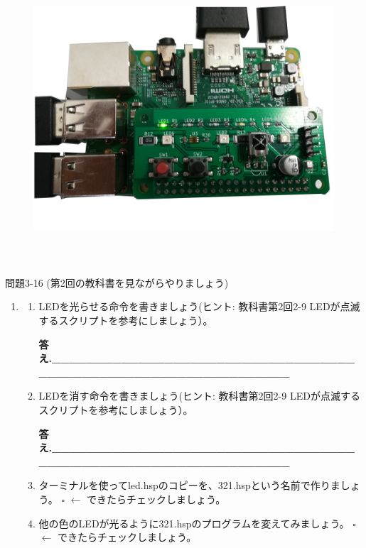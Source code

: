 \documentclass[a4paper,dvipdfmx]{jarticle}
\begin{document}
\begin{figure}
\centering
\includegraphics[width=14.369cm,height=10.776cm]{text03-img/text03-img032.jpg}
\end{figure}
{\ttfamily
問題3-16
(第2回の教科書を見ながらやりましょう)}

\begin{enumerate}
\item \begin{enumerate}
\item
LEDを光らせる命令を書きましょう(ヒント:
教科書第2回2-9
LEDが点滅するスクリプトを参考にしましょう）。


\bigskip


\bigskip

{\ttfamily\bfseries
答え.\_\_\_\_\_\_\_\_\_\_\_\_\_\_\_\_\_\_\_\_\_\_\_\_\_\_\_\_\_\_\_\_\_\_\_\_\_\_\_\_\_\_\_\_\_\_\_\_\_\_\_\_\_\_\_\_\_\_\_\_\_\_\_\_}


\bigskip
\item LEDを消す命令を書きましょう(ヒント:
教科書第2回2-9
LEDが点滅するスクリプトを参考にしましょう）。


\bigskip


\bigskip

{\ttfamily\bfseries
答え.\_\_\_\_\_\_\_\_\_\_\_\_\_\_\_\_\_\_\_\_\_\_\_\_\_\_\_\_\_\_\_\_\_\_\_\_\_\_\_\_\_\_\_\_\_\_\_\_\_\_\_\_\_\_\_\_\_\_\_\_\_\_\_\_}


\bigskip
\item
ターミナルを使ってled.hspのコピーを、321.hspという名前で作りましょう。\newline
${\square}$ $\leftarrow $
できたらチェックしましょう。
\item
他の色のLEDが光るように321.hspのプログラムを変えてみましょう。\newline
${\square}$ $\leftarrow $
できたらチェックしましょう。
\end{enumerate}
\end{enumerate}
\end{document}
